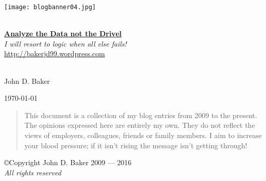 %

\begin{titlepage}
 
\begin{center}

\texttt{[image: blogbanner04.jpg]}
 
\HRule \\[0.8cm]

{\Huge \href{http://bakerjd99.wordpress.com}{\textbf{Analyze the Data not the Drivel}}}\\[0.4cm]

\textsl{I will resort to logic when all else fails!}\\[0.4cm]

\url{http://bakerjd99.wordpress.com}\\[0.4cm]
 
\HRule \\[0.8cm]
 
 
\begin{minipage}{0.45\textwidth}
\begin{flushleft}
{\large John D. Baker} \\
\end{flushleft}
\end{minipage}
\begin{minipage}{0.45\textwidth}
\begin{flushright}
{\large \today} \\
\end{flushright}
\end{minipage}

\vspace{2cm}

\begin{quotation}
This document is a collection of my blog entries from 2009 to the present. The
opinions expressed here are entirely my own.
They do not reflect the views of employers, colleagues, friends or family members.
I aim to increase your blood pressure; if it isn't
rising the message isn't getting through!
\end{quotation}

\vfill

\copyright Copyright John D. Baker 2009 --- 2016 \\
\emph{All rights reserved} \\

 
\end{center}


 
\end{titlepage}

%
